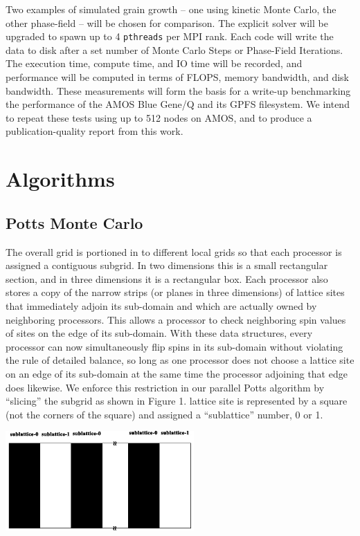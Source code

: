 \documentclass[11pt]{article}
\begin{document}
\begin{multicols}{2}
Two examples of simulated grain growth -- one using kinetic Monte Carlo, the other phase-field -- will be chosen for comparison.
The explicit solver will be upgraded to spawn up to 4 \texttt{pthreads} per MPI rank.
Each code will write the data to disk after a set number of Monte Carlo Steps or Phase-Field Iterations.
The execution time, compute time, and IO time will be recorded, and performance will be computed in terms of FLOPS, memory bandwidth, and disk bandwidth.
These measurements will form the basis for a write-up benchmarking the performance of the AMOS Blue Gene/Q and its GPFS filesystem.
We intend to repeat these tests using up to 512 nodes on AMOS, and to produce a publication-quality report from this work.

\section{Algorithms}

\subsection*{Potts Monte Carlo}
The overall grid is portioned in to different local grids so that each processor is assigned a contiguous subgrid.
In two dimensions this is a small rectangular section, and in three dimensions it is a rectangular box.
Each processor also stores a copy of the narrow strips (or planes in three dimensions) of lattice sites that immediately adjoin its sub-domain and which are actually owned by neighboring processors.
This allows a processor to check neighboring spin values of sites on the edge of its sub-domain.
With these data structures, every processor can now simultaneously flip spins in its sub-domain without violating the rule of detailed balance, 
so long as one processor does not choose a lattice site on an edge of its sub-domain at the same time the processor adjoining that edge does likewise.
We enforce this restriction in our parallel Potts algorithm by ``slicing'' the subgrid as shown in Figure 1. 
lattice site is represented by a square (not the corners of the square) and assigned a ``sublattice'' number, 0 or 1.

\begin{minipage}{0.45\textwidth}\centering
  \includegraphics[height=1.5in]{mc-fig-01}
\end{minipage}




\end{multicols}
\end{document}
